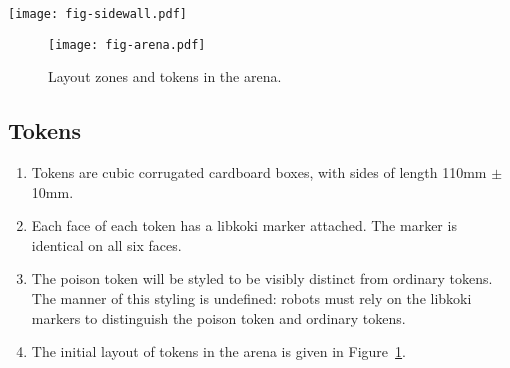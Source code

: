 \begin{sidewaysfigure}
  \texttt{[image: fig-sidewall.pdf]}
  \caption{Layout of markers along each arena wall.}
  \label{fig:sidewall}
\end{sidewaysfigure}

\begin{figure}
  \texttt{[image: fig-arena.pdf]}
  \caption{Layout zones and tokens in the arena.}
  \label{fig:arena}
\end{figure}

\subsection{Tokens}
\label{spec:tokens}

\begin{enumerate}
  \item Tokens are cubic corrugated cardboard boxes, with sides of length
        \si{110}{mm} $\pm$ \si{10}{mm}.
  \item Each face of each token has a libkoki marker attached. The marker is
        identical on all six faces.
  \item The poison token will be styled to be visibly distinct from ordinary
        tokens. The manner of this styling is undefined: robots must rely on
        the libkoki markers to distinguish the poison token and ordinary
        tokens.
  \item The initial layout of tokens in the arena is given in
        Figure~\ref{fig:arena}.
\end{enumerate}

